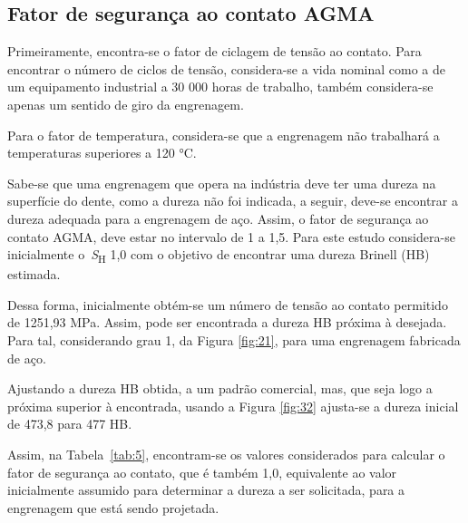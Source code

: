 \documentclass[12pt,a4paper]{article}
\begin{document}
\subsection*{}

{\label{fator-de-seguranuxe7a-ao-contato-agma}}

\subsection*{Fator de segurança ao contato
AGMA}

{\label{fator-de-seguranuxe7a-ao-contato-agma}}

Primeiramente, encontra-se o fator de ciclagem de tensão ao contato.
Para encontrar o número de ciclos de tensão, considera-se a vida nominal
como a de um equipamento industrial a 30 000 horas de trabalho, também
considera-se apenas um sentido de giro da engrenagem.

Para o fator de temperatura, considera-se que a engrenagem não
trabalhará a temperaturas superiores a 120 °C.

Sabe-se que uma engrenagem que opera na indústria deve ter uma dureza na
superfície do dente, como a dureza não foi indicada, a seguir, deve-se
encontrar a dureza adequada para a engrenagem de aço. Assim, o fator de
segurança ao contato AGMA, deve estar no intervalo de 1 a 1,5. Para este
estudo considera-se inicialmente o~\emph{S}\textsubscript{H} 1,0 com o
objetivo de encontrar uma dureza Brinell (HB) estimada.

Dessa forma, inicialmente obtém-se um número de tensão ao contato
permitido de 1251,93 MPa. Assim, pode ser encontrada a dureza HB próxima
à desejada. Para tal, considerando grau 1, da Figura
{\ref{fig:21}}, para uma engrenagem fabricada de aço.

Ajustando a dureza HB obtida, a um padrão comercial, mas, que seja logo
a próxima superior à encontrada, usando a Figura
{\ref{fig:32}} ajusta-se a dureza inicial de 473,8 para
477 HB.

Assim, na Tabela~{\ref{tab:5}}, encontram-se os valores
considerados para calcular o fator de segurança ao contato, que é também
1,0, equivalente ao valor inicialmente assumido para determinar a dureza
a ser solicitada, para a engrenagem que está sendo projetada.
\end{document}
